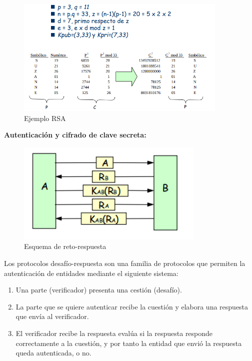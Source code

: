 \documentclass[a4paper,11pt]{article}
\begin{document}
\begin{figure}[h]
\centering
\caption{Ejemplo RSA}
\includegraphics[scale=1,width=0.9\textwidth]{ejemplo_rsa.png}
\end{figure}

\textbf{Autenticación y cifrado de clave secreta:} 

\begin{figure}[h]
\centering
\caption{Esquema de reto-respuesta}
\includegraphics[scale=1,width=0.8\textwidth]{esquema_reto_respuesta.png}
\end{figure}

Los protocolos desafío-respuesta son una familia de protocolos que permiten la autenticación de entidades mediante el siguiente sistema:

\begin{enumerate}
\item Una parte (verificador) presenta una cestión (desafío).
\item La parte que se quiere autenticar recibe la cuestión y elabora una respuesta que envía al verificador.
\item El verificador recibe la respuesta  evalúa si la respuesta responde correctamente a la cuestión, y por tanto la entidad que envió la respuesta queda autenticada, o no.
\end{enumerate}
\end{document}
